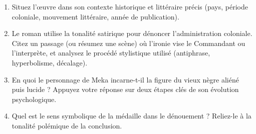 \documentclass[11pt]{article}
\begin{document}
\begin{exercice}
\begin{enumerate}
    \item Situez l'œuvre dans son contexte historique et littéraire précis (pays, période coloniale, mouvement littéraire, année de publication).
    \item Le roman utilise la tonalité satirique pour dénoncer l'administration coloniale. Citez un passage (ou résumez une scène) où l'ironie vise le Commandant ou l'interprète, et analysez le procédé stylistique utilisé (antiphrase, hyperbolisme, décalage).
    \item En quoi le personnage de Meka incarne-t-il la figure du \og vieux nègre \fg{} aliéné puis lucide ? Appuyez votre réponse sur deux étapes clés de son évolution psychologique.
    \item Quel est le sens symbolique de la médaille dans le dénouement ? Reliez-le à la tonalité polémique de la conclusion.
\end{enumerate}
\end{exercice}
\end{document}
